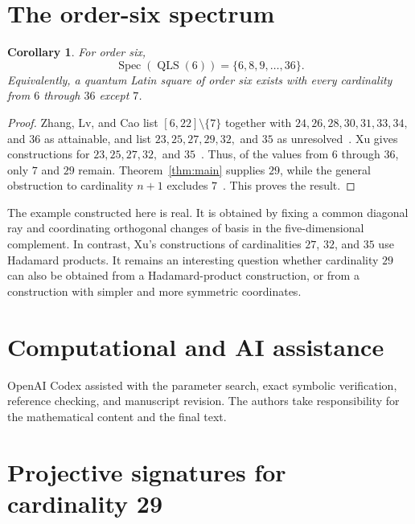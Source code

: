 \documentclass[11pt]{article}
\newtheorem{corollary}[theorem]{Corollary}
\theoremstyle{definition}
\newcommand{\Spec}{\operatorname{Spec}}
\begin{document}
\section{The order-six spectrum}

\begin{corollary}\label{cor:spectrum}
For order six,
\[
\Spec(\operatorname{QLS}(6))=\{6,8,9,\ldots,36\}.
\]
Equivalently, a quantum Latin square of order six exists with every
cardinality from $6$ through $36$ except $7$.
\end{corollary}

\begin{proof}
Zhang, Lv, and Cao list
$[6,22]\setminus\{7\}$ together with
$24,26,28,30,31,33,34,$ and $36$ as attainable, and list
$23,25,27,29,32,$ and $35$ as unresolved~\cite[Table~6]{ZhangLvCao2026}.
Xu gives constructions for $23,25,27,32,$ and $35$~\cite{Xu2026}.  Thus, of
the values from $6$ through $36$, only $7$ and $29$ remain.  Theorem~\ref{thm:main}
supplies $29$, while the general obstruction to cardinality $n+1$ excludes
$7$~\cite[Lemma~3.1]{ZhangWangJi2026}.  This proves the result.
\end{proof}

The example constructed here is real.  It is obtained by fixing a common
diagonal ray and coordinating orthogonal changes of basis in the
five-dimensional complement.  In contrast, Xu's constructions of
cardinalities $27$, $32$, and $35$ use Hadamard products.  It remains an
interesting question whether cardinality $29$ can also be obtained from a
Hadamard-product construction, or from a construction with simpler and more
symmetric coordinates.

\section*{Computational and AI assistance}

OpenAI Codex assisted with the parameter search, exact symbolic verification,
reference checking, and manuscript revision.  The authors take responsibility
for the mathematical content and the final text.

\appendix

\section{Projective signatures for cardinality 29}\label{app:separation}
\end{document}
